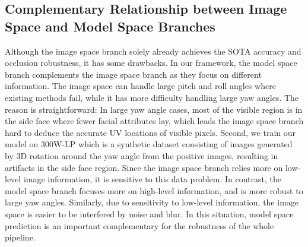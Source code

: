 \documentclass[10pt,twocolumn,letterpaper]{article}
\begin{document}
\begin{table}[]
\centering
{}
\caption{Occlusion resistance results on AFLW2000-3D-occlusion. NME (\%) of 3d dense face alignment is reported.}
\label{tab:occ}
\end{table}


\subsection{Complementary Relationship between Image Space and Model Space Branches}
\label{sec:dual_space}

Although the image space branch solely already achieves the SOTA accuracy and occlusion robustness, it has some drawbacks. In our framework, the model space branch complements the image space branch as they focus on different information. The image space can handle large pitch and roll angles where existing methods fail, while it has more difficulty handling large yaw angles. The reason is straightforward: In large yaw angle cases, most of the visible region is in the side face where fewer facial attributes lay, which leads the image space branch hard to deduce the accurate UV locations of visible pixels. Second, we train our model on 300W-LP which is a synthetic dataset consisting of images generated by 3D rotation around the yaw angle from the positive images, resulting in artifacts in the side face region. Since the image space branch relies more on low-level image information, it is sensitive to this data problem. In contrast, the model space branch focuses more on high-level information, and is more robust to large yaw angles. Similarly, due to sensitivity to low-level information, the image space is easier to be interfered by noise and blur. In this situation, model space prediction is an important complementary for the robustness of the whole pipeline.
\end{document}
